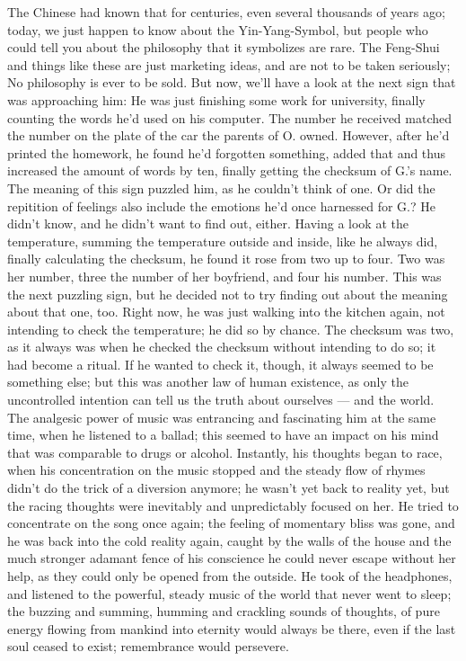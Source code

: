 The Chinese had known that for centuries, even several thousands of years ago; today, we just happen to know about the Yin-Yang-Symbol, but people who could tell you about the philosophy that it symbolizes are rare. 
The Feng-Shui and things like these are just marketing ideas, and are not to be taken seriously; No philosophy is ever to be sold. 
But now, we'll have a look at the next sign that was approaching him: He was just finishing some work for university, finally counting the words he'd used on his computer. 
The number he received matched the number on the plate of the car the parents of O. owned. 
However, after he'd printed the homework, he found he'd forgotten something, added that and thus increased the amount of words by ten, finally getting the checksum of G.'s name. 
The meaning of this sign puzzled him, as he couldn't think of one. 
Or did the repitition of feelings also include the emotions he'd once harnessed for G.?
He didn't know, and he didn't want to find out, either. 
Having a look at the temperature, summing the temperature outside and inside, like he always did, finally calculating the checksum, he found it rose from two up to four. 
Two was her number, three the number of her boyfriend, and four his number. 
This was the next puzzling sign, but he decided not to try finding out about the meaning about that one, too. 
Right now, he was just walking into the kitchen again, not intending to check the temperature; he did so by chance. The checksum was two, as it always was when he checked the checksum without intending to do so; it had become a ritual. If he wanted to check it, though, it always seemed to be something else; but this was another law of human existence, as only the uncontrolled intention can tell us the truth about ourselves --- and the world. 
The analgesic power of music was entrancing and fascinating him at the same time, when he listened to a ballad; this seemed to have an impact on his mind that was comparable to drugs or alcohol. Instantly, his thoughts began to race, when his concentration on the music stopped and the steady flow of rhymes didn't do the trick of a diversion anymore; he wasn't yet back to reality yet, but the racing thoughts were inevitably and unpredictably focused on her. He tried to concentrate on the song once again; the feeling of momentary bliss was gone, and he was back into the cold reality again, caught by the walls of the house and the much stronger adamant fence of his conscience he could never escape without her help, as they could only be opened from the outside. 
He took of the headphones, and listened to the powerful, steady music of the world that never went to sleep; the buzzing and summing, humming and crackling sounds of thoughts, of pure energy flowing from mankind into eternity would always be there, even if the last soul ceased to exist; remembrance would persevere. 
